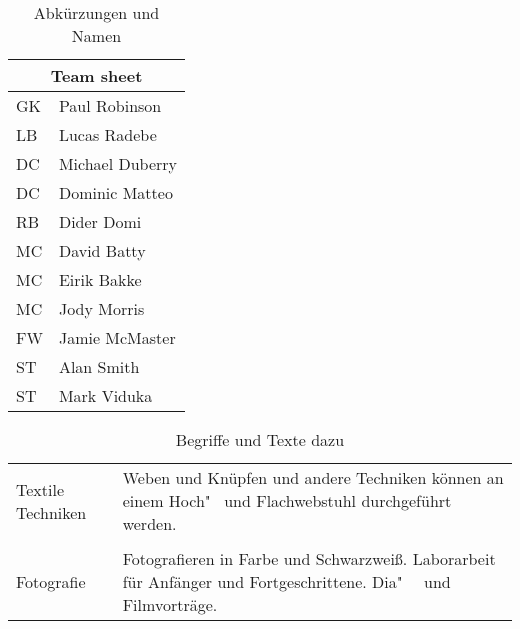 \begin{table}[ht]
	\centering
	\caption{Abkürzungen und Namen}
	\begin{tabular}{ |l|l| }
		\hline
		\multicolumn{2}{|c|}{Team sheet} \\
		\hline
		GK & Paul Robinson \\
		LB & Lucas Radebe \\
		DC & Michael Duberry \\
		DC & Dominic Matteo \\
		RB & Dider Domi \\
		MC & David Batty \\
		MC & Eirik Bakke \\
		MC & Jody Morris \\
		FW & Jamie McMaster \\
		ST & Alan Smith \\
		ST & Mark Viduka \\
		\hline
	\end{tabular}
	\label{tabelle:Nummer4}
\end{table}

\begin{table}[ht]
	\centering
	\caption{Begriffe und Texte dazu}
	\begin{tabular}{l p{8cm}}
		Textile Techniken	& Weben und Knüpfen und andere Techniken können an einem Hoch"~ und Flachwebstuhl durchgeführt werden.
		\tabularnewline[10pt]
		\cline{2-2}
		\tabularnewline[5pt]
		Fotografie			& Fotografieren in Farbe und Schwarzweiß. Laborarbeit für Anfänger und Fortgeschrittene. Dia"~~ und Filmvorträge.
	\end{tabular}
	\label{tabelle:Nummer3}
\end{table}


